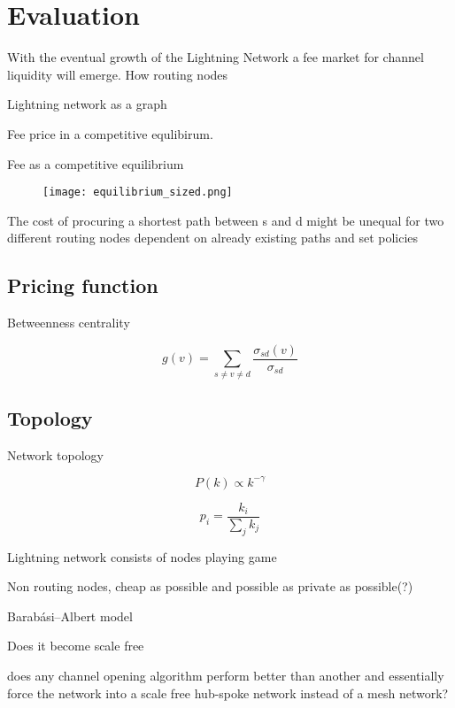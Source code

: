 \chapter{Evaluation}

With the eventual growth of the Lightning Network a fee market for channel liquidity will emerge. How routing nodes 

Lightning network as a graph

Fee price in a competitive equlibirum.


Fee as a competitive equilibrium 



\begin{figure}[!htb]
	\hspace*{-0.7cm} 
	\centering
	\texttt{[image: equilibrium\_sized.png]}
	\caption{ 
		}
		\label{fig:equilibrium}
		\hspace*{2mm} 	
\end{figure}



The cost of procuring a shortest path between s and d might be unequal for two different routing nodes dependent on already existing paths and set policies

\section{Pricing function}

Betweenness centrality

\[ g(v) = \sum_{s \neq v \neq d}\frac{\sigma_{sd}(v)}{\sigma_{sd}} \]

\section{Topology}

Network topology

\[ P(k) \propto k^{-\gamma} \]

\[ p_i = \dfrac{k_i}{\sum_{j}^{}k_j}  \]


Lightning network consists of nodes playing game

Non routing nodes, cheap as possible and possible as private as possible(?) 

Barabási–Albert model

Does it become scale free

does any channel opening algorithm perform better than another and essentially force the network into a scale free hub-spoke network instead of a mesh network?


